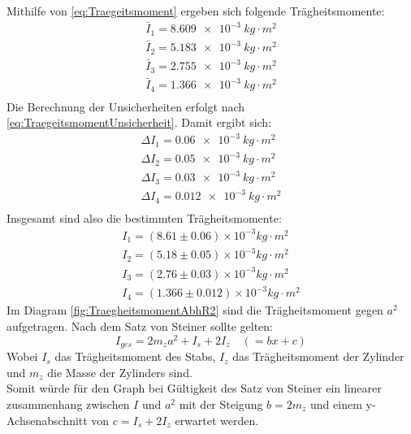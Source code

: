 \documentclass{report}
\begin{document}
Mithilfe von \ref{eq:Traegeitsmoment} ergeben sich folgende Trägheitsmomente:
\begin{equation}
    \begin{split}
        \bar{I}_1 = \qty{8.609e-3}{kg \cdot m^2} \\
        \bar{I}_2 = \qty{5.183e-3}{kg \cdot m^2} \\
        \bar{I}_3 = \qty{2.755e-3}{kg \cdot m^2} \\
        \bar{I}_4 = \qty{1.366e-3}{kg \cdot m^2} \\
    \end{split}
\end{equation}
Die Berechnung der Unsicherheiten erfolgt nach \ref{eq:TraegeitsmomentUnsicherheit}. Damit ergibt sich:
\begin{equation}
    \begin{split}
        \Delta I_1 = \qty{0.06e-3}{kg \cdot m^2} \\
        \Delta I_2 = \qty{0.05e-3}{kg \cdot m^2} \\
        \Delta I_3 = \qty{0.03e-3}{kg \cdot m^2} \\
        \Delta I_4 = \qty{0.012e-3}{kg \cdot m^2} \\
    \end{split}
\end{equation}
Insgesamt sind also die bestimmten Trägheitsmomente:
\begin{equation}
    \begin{split}
        I_1 = (8.61 \pm 0.06) \times 10^{-3} \si{kg \cdot m^2} \\
        I_2 = (5.18 \pm 0.05) \times 10^{-3} \si{kg \cdot m^2} \\
        I_3 = (2.76 \pm 0.03) \times 10^{-3} \si{kg \cdot m^2} \\
        I_4 = (1.366 \pm 0.012) \times 10^{-3} \si{kg \cdot m^2}
    \end{split}
\end{equation}
Im Diagram \ref{fig:TraegheitsmomentAbhR2} sind die Trägheitsmoment gegen $a^2$ aufgetragen.
Nach dem Satz von Steiner sollte gelten:
\begin{equation}
    I_{ges} =2m_za^2 + I_s + 2I_z \quad (= bx + c)
    \label{eq:SteinerII}
\end{equation}
Wobei $I_s$ das Trägheitsmoment des Stabs, $I_z$ das Trägheitsmoment der Zylinder und $m_z$ die Masse der Zylinders sind. \\ Somit würde für den Graph bei Gültigkeit des Satz von Steiner 
ein linearer zusammenhang zwischen $I$ und $a^2$ mit der Steigung $b = 2m_z$ und einem y-Achsenabschnitt von $c = I_s + 2I_z$ erwartet werden. 
\end{document}
